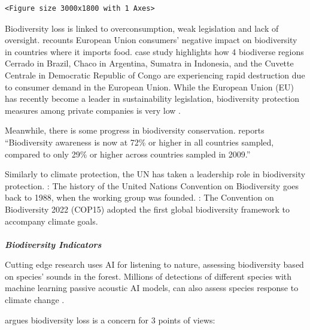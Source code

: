 \documentclass[
  letterpaper,
  DIV=11,
  numbers=noendperiod]{scrartcl}
\makeatletter
\let\oldparagraph\paragraph
\renewcommand{\paragraph}{
    \@ifstar
      \xxxParagraphStar
      \xxxParagraphNoStar
  }
\newcommand{\xxxParagraphStar}[1]{\oldparagraph*{#1}\mbox{}}
\newcommand{\xxxParagraphNoStar}[1]{\oldparagraph{#1}\mbox{}}
\makeatother
\begin{document}
\begin{verbatim}
<Figure size 3000x1800 with 1 Axes>
\end{verbatim}

Biodiversity loss is linked to overconsumption, weak legislation and
lack of oversight. \citep{crennaBiodiversityImpactsDue2019} recounts
European Union consumers' negative impact on biodiversity in countries
where it imports food. \citet{wwfForestsReducingEU2022} case study
highlights how 4 biodiverse regions Cerrado in Brazil, Chaco in
Argentina, Sumatra in Indonesia, and the Cuvette Centrale in Democratic
Republic of Congo are experiencing rapid destruction due to consumer
demand in the European Union. While the European Union (EU) has recently
become a leader in sustainability legislation, biodiversity protection
measures among private companies is very low
\citet{marco-fondevilaTrendsPrivateSector2023}.

Meanwhile, there is some progress in biodiversity conservation.
\citet{uebtBiodiversityBarometer2022} reports ``Biodiversity awareness
is now at 72\% or higher in all countries sampled, compared to only 29\%
or higher across countries sampled in 2009.''

Similarly to climate protection, the UN has taken a leadership role in
biodiversity protection. \citet{unitHistoryConvention2023}: The history
of the United Nations Convention on Biodiversity goes back to 1988, when
the working group was founded. \citet{unepCOP15EndsLandmark2022}: The
Convention on Biodiversity 2022 (COP15) adopted the first global
biodiversity framework to accompany climate goals.

\paragraph{\texorpdfstring{\textbf{\emph{Biodiversity
Indicators}}}{Biodiversity Indicators}}\label{biodiversity-indicators}

Cutting edge research uses AI for listening to nature, assessing
biodiversity based on species' sounds in the forest. Millions of
detections of different species with machine learning passive acoustic
AI models, can also assess species response to climate change
\citep{aiforgoodListeningNatureHarnessing2023, guerreroAcousticAnimalIdentification2023}.

\citet{mayWhyShouldWe2011} argues biodiversity loss is a concern for 3
points of views:
\end{document}
